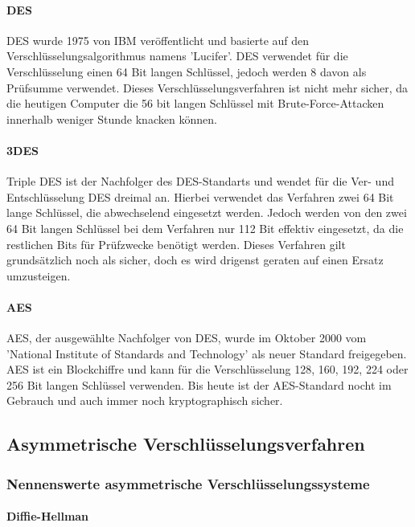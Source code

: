 \documentclass[12pt,a4paper]{report}
\begin{document}
\begin{onehalfspace}
\paragraph{DES}

DES wurde 1975 von IBM veröffentlicht und basierte auf den Verschlüsselungsalgorithmus namens 'Lucifer'. DES verwendet für die Verschlüsselung einen 64 Bit langen Schlüssel, jedoch werden 8 davon als Prüfsumme verwendet. Dieses Verschlüsselungsverfahren ist nicht mehr sicher, da die heutigen Computer die 56 bit langen Schlüssel mit Brute-Force-Attacken innerhalb weniger Stunde knacken können.

\paragraph{3DES}

Triple DES ist der Nachfolger des DES-Standarts und wendet für die Ver- und Entschlüsselung DES dreimal an. Hierbei verwendet das Verfahren zwei 64 Bit lange Schlüssel, die abwechselend eingesetzt werden. Jedoch werden von den zwei 64 Bit langen Schlüssel bei dem Verfahren nur 112 Bit effektiv eingesetzt, da die restlichen Bits für Prüfzwecke benötigt werden. Dieses Verfahren gilt grundsätzlich noch als sicher, doch es wird drigenst geraten auf einen Ersatz umzusteigen.

\paragraph{AES}

AES, der ausgewählte Nachfolger von DES, wurde im Oktober 2000 vom 'National Institute of Standards and Technology' als neuer Standard freigegeben. AES ist ein Blockchiffre und kann für die Verschlüsselung 128, 160, 192, 224 oder 256 Bit langen Schlüssel verwenden. Bis heute ist der AES-Standard nocht im Gebrauch und auch immer noch kryptographisch sicher.

\subsection{Asymmetrische Verschlüsselungsverfahren}

\subsubsection{Nennenswerte asymmetrische Verschlüsselungssysteme}

\paragraph{Diffie-Hellman}


\end{onehalfspace}
\end{document}
